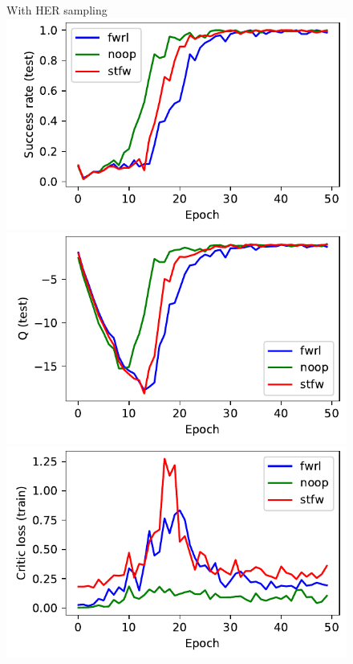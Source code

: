 %
\begin{figure}%
  \def\frac{0.24}
  With HER sampling\\
  \includegraphics[width=\frac\columnwidth]{media/res/ea0e35b-FetchPush-v1-stfw-future/test/success_rate.pdf}%
  \includegraphics[width=\frac\columnwidth]{media/res/ea0e35b-FetchPush-v1-stfw-future/test/mean_Q.pdf}%
  \includegraphics[width=\frac\columnwidth]{media/res/ea0e35b-FetchPush-v1-stfw-future/train/critic_loss.pdf}%

\end{figure}
